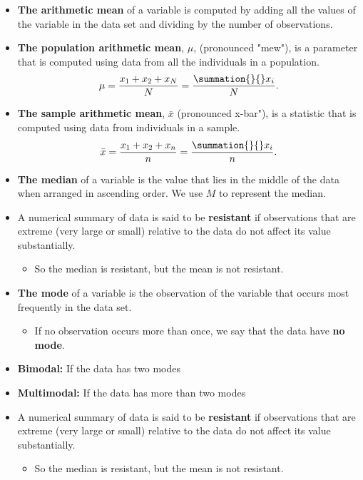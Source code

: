 \documentclass{report}
\begin{document}
        \begin{itemize}
            \item \textbf{The arithmetic mean} of a variable is computed by adding all the values of the variable in the data set and dividing by the number of observations.
            \item \textbf{The population arithmetic mean}, $\mu$, (pronounced "mew"), is a parameter that is computed using data from all the individuals in a population.
                \begin{align*}
                    \mu = \frac{x_{1}+x_{2} + x_{N}}{N} = \frac{\summation{}{}x_{i}}{N}
                .\end{align*}
            \item \textbf{The sample arithmetic mean}, $\bar{x}$ (pronounced x-bar"), is a statistic that is computed using data from individuals in a sample.
                \begin{align*}
                    \bar{x} = \frac{x_{1}+x_{2} + x_{n}}{n} = \frac{\summation{}{}x_{i}}{n}
                .\end{align*}
            \item \textbf{The median} of a variable is the value that lies in the middle of the data when arranged in ascending order. We use $M$  to represent the median.
            \item A numerical summary of data is said to be \textbf{resistant} if observations that are extreme (very large or small) relative to the data do not affect its value substantially.
                \begin{itemize}
                    \item So the median is resistant, but the mean is not resistant.
                \end{itemize}
            \item \textbf{The mode} of a variable is the observation of the variable that occurs most frequently in the data set.
                \begin{itemize}
                    \item If no observation occurs more than once, we say that the data have \textbf{no mode}.
                \end{itemize}
            \item \textbf{Bimodal:} If the data has two modes
            \item \textbf{Multimodal:} If the data has more than two modes
            \item A numerical summary of data is said to be \textbf{resistant} if observations that are extreme (very large or small) relative to the data do not affect its value substantially.
                \begin{itemize}
                    \item So the median is resistant, but the mean is not resistant.
                \end{itemize}
        \end{itemize}
\end{document}
